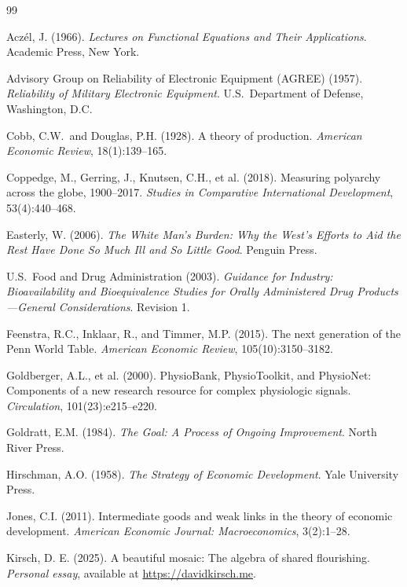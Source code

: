 \documentclass[12pt, a4paper]{article}
\theoremstyle{definition}
\theoremstyle{remark}
\begin{document}
\begin{thebibliography}{99}

Acz\'el, J. (1966). \textit{Lectures on Functional Equations and Their Applications}. Academic Press, New York.

Advisory Group on Reliability of Electronic Equipment (AGREE) (1957). \textit{Reliability of Military Electronic Equipment}. U.S.\ Department of Defense, Washington, D.C.

Cobb, C.W.\ and Douglas, P.H. (1928). A theory of production. \textit{American Economic Review}, 18(1):139--165.

Coppedge, M., Gerring, J., Knutsen, C.H., et al. (2018). Measuring polyarchy across the globe, 1900--2017. \textit{Studies in Comparative International Development}, 53(4):440--468.

Easterly, W. (2006). \textit{The White Man's Burden: Why the West's Efforts to Aid the Rest Have Done So Much Ill and So Little Good}. Penguin Press.

U.S.\ Food and Drug Administration (2003). \textit{Guidance for Industry: Bioavailability and Bioequivalence Studies for Orally Administered Drug Products---General Considerations}. Revision 1.

Feenstra, R.C., Inklaar, R., and Timmer, M.P. (2015). The next generation of the Penn World Table. \textit{American Economic Review}, 105(10):3150--3182.

Goldberger, A.L., et al. (2000). PhysioBank, PhysioToolkit, and PhysioNet: Components of a new research resource for complex physiologic signals. \textit{Circulation}, 101(23):e215--e220.

Goldratt, E.M. (1984). \textit{The Goal: A Process of Ongoing Improvement}. North River Press.

Hirschman, A.O. (1958). \textit{The Strategy of Economic Development}. Yale University Press.

Jones, C.I. (2011). Intermediate goods and weak links in the theory of economic development. \textit{American Economic Journal: Macroeconomics}, 3(2):1--28.

Kirsch, D. E. (2025). A beautiful mosaic: The algebra of shared flourishing. \textit{Personal essay}, available at \url{https://davidkirsch.me}.


\end{thebibliography}
\end{document}
